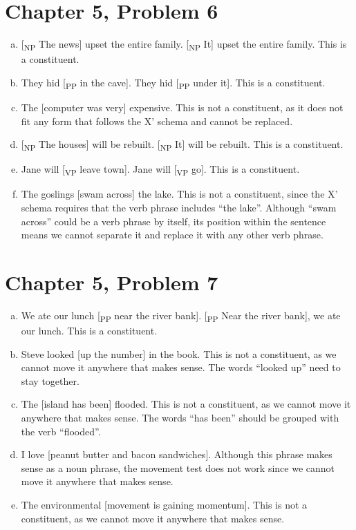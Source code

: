 \documentclass[12pt]{article}
\begin{document}
\section*{Chapter 5, Problem 6}

\begin{enumerate}[a)]
    \item {[\textsubscript{NP} The news] upset the entire family. [\textsubscript{NP} It] upset the entire family. This is a constituent.}
    \item They hid [\textsubscript{PP} in the cave]. They hid [\textsubscript{PP} under it]. This is a constituent.
    \item The [computer was very] expensive. This is not a constituent, as it does not fit any form that follows the X' schema and cannot be replaced.
    \item {[\textsubscript{NP} The houses] will be rebuilt. [\textsubscript{NP} It] will be rebuilt. This is a constituent.}
    \item Jane will [\textsubscript{VP} leave town]. Jane will [\textsubscript{VP} go]. This is a constituent.
    \item The goslings [swam across] the lake. This is not a constituent, since the X' schema requires that the verb phrase includes ``the lake''.
    Although ``swam across'' could be a verb phrase by itself, its position within the sentence means we cannot separate it and replace it with any other verb phrase.
\end{enumerate}

\section*{Chapter 5, Problem 7}

\begin{enumerate}[a)]
    \item We ate our lunch [\textsubscript{PP} near the river bank]. [\textsubscript{PP} Near the river bank], we ate our lunch. This is a constituent.
    \item Steve looked [up the number] in the book. This is not a constituent, as we cannot move it anywhere that makes sense. The words ``looked up'' need to stay together.
    \item The [island has been] flooded. This is not a constituent, as we cannot move it anywhere that makes sense. The words ``has been'' should be grouped with the verb ``flooded''.
    \item I love [peanut butter and bacon sandwiches]. Although this phrase makes sense as a noun phrase, the movement test does not work since we cannot move it anywhere that makes sense.
    \item The environmental [movement is gaining momentum]. This is not a constituent, as we cannot move it anywhere that makes sense.
\end{enumerate}
\end{document}
